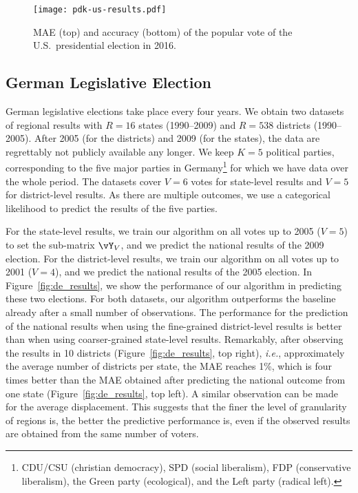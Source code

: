 \begin{figure}
	\texttt{[image: pdk-us-results.pdf]}
	\caption{MAE (top) and accuracy (bottom) of the popular vote of the U.S.\ presidential election in 2016.}
	\label{fig:us_results}
\end{figure}

\subsection{German Legislative Election}

German legislative elections take place every four years.
We obtain two datasets \cite{norsk2020germany} of regional results with $R=16$ states (1990--2009) and $R=538$ districts (1990--2005).
After 2005 (for the districts) and 2009 (for the states), the data are regrettably not publicly available any longer.
We keep $K = 5$ political parties, corresponding to the five major parties in Germany\footnote{CDU/CSU (christian democracy), SPD (social liberalism), FDP (conservative liberalism), the Green party (ecological), and the Left party (radical left).} for which we have data over the whole period.
The datasets cover $V=6$ votes for state-level results and $V=5$ for district-level results.
As there are multiple outcomes, we use a categorical likelihood to predict the results of the five parties.

For the state-level results, we train our algorithm on all votes up to 2005 ($V = 5$) to set the sub-matrix $\vY_V$, and we predict the national results of the 2009 election.
For the district-level results, we train our algorithm on all votes up to 2001 ($V = 4$), and we predict the national results of the 2005 election.
In Figure~\ref{fig:de_results}, we show the performance of our algorithm in predicting these two elections.
For both datasets, our algorithm outperforms the baseline already after a small number of observations.
The performance for the prediction of the national results when using the fine-grained district-level results is better than when using coarser-grained state-level results.
Remarkably, after observing the results in 10 districts (Figure~\ref{fig:de_results}, top right), \textit{i.e.}, approximately the average number of districts per state, the MAE reaches 1\%, which is four times better than the MAE obtained after predicting the national outcome from one state (Figure~\ref{fig:de_results}, top left).
A similar observation can be made for the average displacement.
This suggests that the finer the level of granularity of regions is, the better the predictive performance is, even if the observed results are obtained from the same number of voters.

